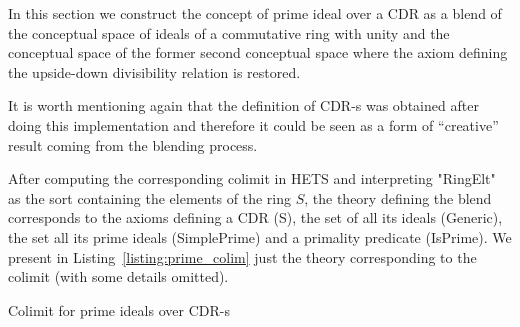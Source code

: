 


    In this section we construct the concept of prime ideal over a CDR as a    
    blend of the conceptual space of ideals of a commutative ring with         
    unity and the conceptual space of the former second conceptual space where
    the axiom defining the upside-down divisibility          
    relation is restored.


It is worth mentioning again that the definition of CDR-s was obtained after
doing this implementation and therefore it could be seen as a form of
``creative'' result coming from the blending process.


After computing the corresponding colimit in HETS and interpreting
"RingElt" as the sort containing the elements of the ring $S$, the
theory defining the blend corresponds to the axioms defining a CDR
(S), the set of all its ideals (Generic), the set all its prime ideals
(SimplePrime) and a primality predicate (IsPrime).  We present 
in Listing~\ref{listing:prime_colim}
just the theory corresponding to the colimit (with some details
omitted). 

% 
  \begin{listing}[!ht]
    \begin{mdframed}
     \begin{footnotesize}
      
    \end{footnotesize}
  \end{mdframed}
    \caption{Colimit for prime ideals over CDR-s}
    \label{listing:prime_colim}
  \end{listing}

